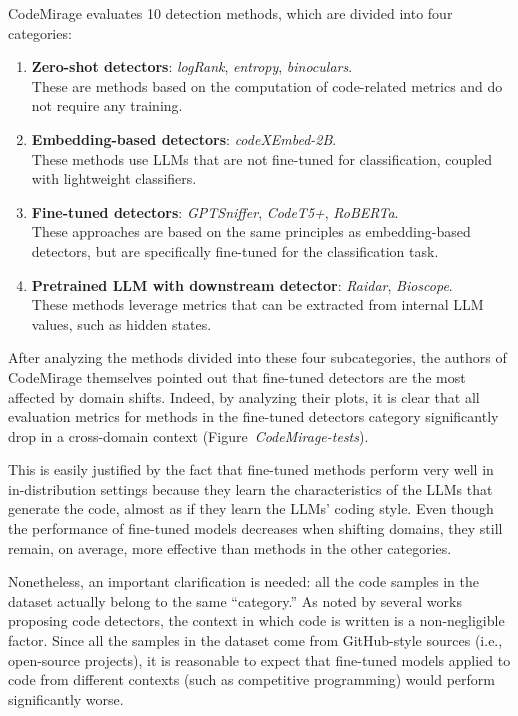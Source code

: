 CodeMirage evaluates 10 detection methods, which are divided into four categories:
\begin{enumerate}
    \item \textbf{Zero-shot detectors}: \textit{logRank}, \textit{entropy}, \textit{binoculars}.\\
    These are methods based on the computation of code-related metrics and do not require any training.
    
    \item \textbf{Embedding-based detectors}: \textit{codeXEmbed-2B}.\\
    These methods use LLMs that are not fine-tuned for classification, coupled with lightweight classifiers.
    
    \item \textbf{Fine-tuned detectors}: \textit{GPTSniffer}, \textit{CodeT5+}, \textit{RoBERTa}.\\
    These approaches are based on the same principles as embedding-based detectors, but are specifically fine-tuned for the classification task.
    
    \item \textbf{Pretrained LLM with downstream detector}: \textit{Raidar}, \textit{Bioscope}.\\
    These methods leverage metrics that can be extracted from internal LLM values, such as hidden states.
\end{enumerate}

After analyzing the methods divided into these four subcategories, 
the authors of CodeMirage themselves pointed out that fine-tuned 
detectors are the most affected by domain shifts. Indeed, by analyzing 
their plots, it is clear that all evaluation metrics for methods in the 
fine-tuned detectors category significantly drop in a cross-domain context 
(Figure~\textit{CodeMirage-tests}). 

This is easily justified by the fact that fine-tuned methods perform 
very well in in-distribution settings because they learn the 
characteristics of the LLMs that generate the code, almost as if 
they learn the LLMs' coding style. Even though the performance of 
fine-tuned models decreases when shifting domains, they still remain, 
on average, more effective than methods in the other categories.

Nonetheless, an important clarification is needed: all the code samples 
in the dataset actually belong to the same “category.” As noted by several 
works proposing code detectors, the context in which code is written is a 
non-negligible factor. Since all the samples in the dataset come from 
GitHub-style sources (i.e., open-source projects), it is reasonable to 
expect that fine-tuned models applied to code from different contexts 
(such as competitive programming) would perform significantly worse.


